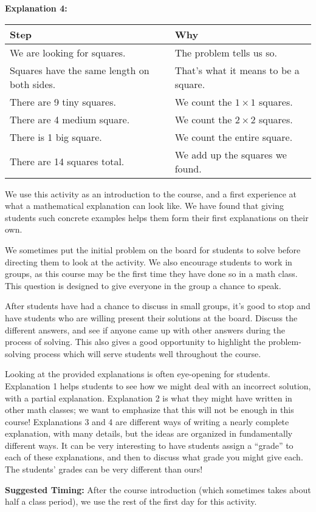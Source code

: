 \documentclass{ximera}
\begin{document}
\begin{mdframed}
{\bf Explanation 4:}

\begin{tabularx}{\textwidth}{X|X}
    Step & Why  \\ \hline \hline
    We are looking for squares. & The problem tells us so. \\ \hline
    Squares have the same length on both sides. & That's what it means to be a square. \\ \hline
    There are 9 tiny squares. & We count the $1\times 1$ squares. \\ \hline
    There are 4 medium square. & We count the $2 \times 2$ squares. \\ \hline
    There is 1 big square. & We count the entire square. \\ \hline
    There are 14 squares total. & We add up the squares we found. \\
\end{tabularx}
\end{mdframed}




\newpage


\begin{instructorNotes}
We use this activity as an introduction to the course, and a first experience at what a mathematical explanation can look like.  We have found that giving students such concrete examples helps them form their first explanations on their own.


We sometimes put the initial problem on the board for students to solve before directing them to look at the activity.  We also encourage students to work in groups, as this course may be the first time they have done so in a math class.  This question is designed to give everyone in the group a chance to speak.

After students have had a chance to discuss in small groups, it's good to stop and have students who are willing present their solutions at the board.  Discuss the different answers, and see if anyone came up with other answers during the process of solving.  This also gives a good opportunity to highlight the problem-solving process which will serve students well throughout the course.



Looking at the provided explanations is often eye-opening for students.  Explanation 1 helps students to see how we might deal with an incorrect solution, with a partial explanation.  Explanation 2 is what they might have written in other math classes; we want to emphasize that this will not be enough in this course!  Explanations 3 and 4 are different ways of writing a nearly complete explanation, with many details, but the ideas are organized in fundamentally different ways.  It can be very interesting to have students assign a ``grade'' to each of these explanations, and then to discuss what grade you might give each.  The students' grades can be very different than ours!


{\bf Suggested Timing:} After the course introduction (which sometimes takes about half a class period), we use the rest of the first day for this activity.

\end{instructorNotes}
\end{document}
